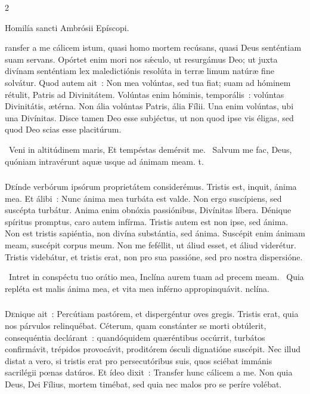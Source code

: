 \documentclass[9pt,twoside]{extarticle}
\begin{document}
\begin{multicols}{2}
\begin{center} Homilía sancti Ambrósii Epíscopi.\\
\end{center}
ransfer a me cálicem istum, quasi homo mortem recúsans, quasi Deus senténtiam suam servans. Opórtet enim mori nos sǽculo, ut resurgámus Deo; ut juxta divínam senténtiam lex maledictiónis resolúta in terræ limum natúræ fine solvátur. Quod autem ait~: Non mea volúntas, sed tua fiat; suam ad hóminem rétulit, Patris ad Divinitátem. Volúntas enim hóminis, temporális~: volúntas Divinitátis, ætérna. Non ália volúntas Patris, ália Fílii. Una enim volúntas, ubi una Divínitas. Disce tamen Deo esse subjéctus, ut non quod ipse vis éligas, sed quod Deo scias esse placitúrum.

\begin{tightlist}{}
\item {}~Veni in altitúdinem maris, \textred{*} Et tempéstas demérsit me. ~Salvum me fac, Deus, quóniam intravérunt aquæ usque ad ánimam meam. t.
\end{tightlist}

\subsubsection*{\center{}}
\lettrine{D}eínde verbórum ipsórum proprietátem considerémus. Tristis est, inquit, ánima mea. Et álibi~: Nunc ánima mea turbáta est valde. Non ergo suscípiens, sed suscépta turbátur. Anima enim obnóxia passiónibus, Divínitas líbera. Dénique spíritus promptus, caro autem infírma. Tristis autem est non ipse, sed ánima. Non est tristis sapiéntia, non divína substántia, sed ánima. Suscépit enim ánimam meam, suscépit corpus meum. Non me feféllit, ut áliud esset, et áliud viderétur. Tristis videbátur, et tristis erat, non pro sua passióne, sed pro nostra dispersióne.

\begin{tightlist}{}
\item {}~Intret in conspéctu tuo orátio mea, \textred{*} Inclína aurem tuam ad precem meam. ~Quia repléta est malis ánima mea, et vita mea inférno appropinquávit. nclína.
\end{tightlist}

\subsubsection*{\center{}}
\lettrine{D}enique ait~: Percútiam pastórem, et dispergéntur oves gregis. Tristis erat, quia nos párvulos relinquébat. Céterum, quam constánter se morti obtúlerit, consequéntia declárant~: quandóquidem quæréntibus occúrrit, turbátos confirmávit, trépidos provocávit, proditórem ósculi dignatióne suscépit. Nec illud distat a vero, si tristis erat pro persecutóribus suis, quos sciébat immánis sacrilégii pœnas datúros. Et ídeo dixit~: Transfer hunc cálicem a me. Non quia Deus, Dei Fílius, mortem timébat, sed quia nec malos pro se períre volébat.


\end{multicols}
\end{document}
